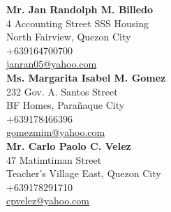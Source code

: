 %
%
%                 
\label{sec:appendixd}

\newcommand{\person}[4]{\textbf{#1} \\ #2 \\ #3 \\ \url{#4}\vspace{0.5em}\\}


\person{Mr. Jan Randolph M. Billedo}{4 Accounting Street SSS Housing\\North Fairview, Quezon City}{+639164700700}{janran05@yahoo.com}
\person{Ms. Margarita Isabel M. Gomez}{232 Gov. A. Santos Street\\BF Homes, Parañaque City}{+639178466396}{gomezmim@yahoo.com}
\person{Mr. Carlo Paolo C. Velez}{47 Matimtiman Street\\Teacher's Village East, Quezon City}{+639178291710}{cpvelez@yahoo.com}